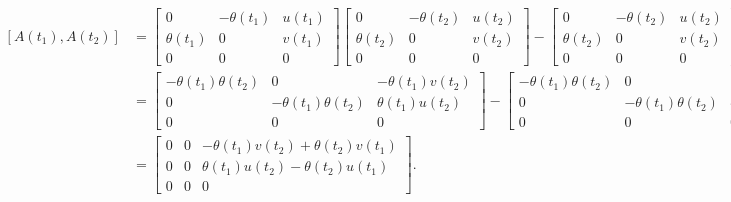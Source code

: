 \begin{equation*}
  \begin{aligned}
    \left[ A(t_1), A(t_2) \right] & = \begin{bmatrix}
      0 & -\theta(t_1) & u(t_1) \\ \theta(t_1) & 0 & v(t_1) \\ 0 & 0 & 0
    \end{bmatrix} \begin{bmatrix}
      0 & -\theta(t_2) & u(t_2) \\ \theta(t_2) & 0 & v(t_2) \\ 0 & 0 & 0
    \end{bmatrix} - \begin{bmatrix}
      0 & -\theta(t_2) & u(t_2) \\ \theta(t_2) & 0 & v(t_2) \\ 0 & 0 & 0
    \end{bmatrix} \begin{bmatrix}
      0 & -\theta(t_1) & u(t_1) \\ \theta(t_1) & 0 & v(t_1) \\ 0 & 0 & 0
    \end{bmatrix} \\
                                  & = \begin{bmatrix}
      -\theta(t_1) \theta(t_2) & 0                        & -\theta(t_1)v(t_2) \\
      0                        & -\theta(t_1) \theta(t_2) & \theta(t_1)u(t_2)  \\
      0                        & 0                        & 0
    \end{bmatrix} - \begin{bmatrix}
      -\theta(t_1) \theta(t_2) & 0                        & -\theta(t_2) v(t_1) \\
      0                        & -\theta(t_1) \theta(t_2) & \theta(t_2) u(t_1)  \\
      0                        & 0                        & 0
    \end{bmatrix}                                                       \\
                                  & = \begin{bmatrix}
      0 & 0 & -\theta(t_1) v(t_2) + \theta(t_2) v(t_1) \\
      0 & 0 & \theta(t_1) u(t_2) - \theta(t_2) u(t_1)  \\
      0 & 0 & 0
    \end{bmatrix}.
  \end{aligned}
\end{equation*}

